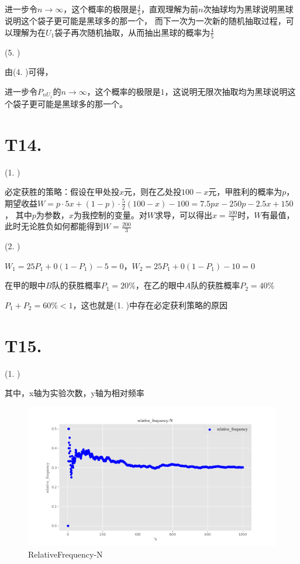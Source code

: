 \documentclass{article}
\begin{document}
~

进一步令$n \to \infty$，这个概率的极限是$\frac{4}{5}$，直观理解为前$n$次抽球均为黑球说明黑球说明这个袋子更可能是黑球多的那一个，
而下一次为一次新的随机抽取过程，可以理解为在$U_1$袋子再次随机抽取，从而抽出黑球的概率为$\frac{4}{5}$

(5. )

由(4. )可得，

进一步令$P_{nU_1}$的$n \to \infty$，这个概率的极限是$1$，这说明无限次抽取均为黑球说明这个袋子更可能是黑球多的那一个。

\section*{T14. }

(1. )

必定获胜的策略：假设在甲处投$x$元，则在乙处投$100-x$元，甲胜利的概率为$p$，期望收益$W=p\cdot 5x+(1-p)\cdot \frac{5}{2}(100-x)-100=7.5px-250p-2.5x+150$，
其中$p$为参数，$x$为我控制的变量。对$W$求导，可以得出$x=\frac{100}{3}$时，$W$有最值，此时无论胜负如何都能得到$W=\frac{200}{3}$

(2. )

$W_1=25P_1+0(1-P_1)-5=0$，$W_2=25P_1+0(1-P_1)-10=0$

在甲的眼中$B$队的获胜概率$P_1=20\%$，在乙的眼中$A$队的获胜概率$P_2=40\%$

$P_1+P_2=60\%<1$，这也就是(1. )中存在必定获利策略的原因

\section*{T15. }

(1. )

其中，x轴为实验次数，y轴为相对频率

\begin{center}
    \begin{figure}[H] %
        \centering %
        \includegraphics[width=1.0\textwidth]{img/Figure_1.png} %
        \caption{RelativeFrequency-N} %
        \label{fig1} %
    \end{figure}
\end{center}
\end{document}

